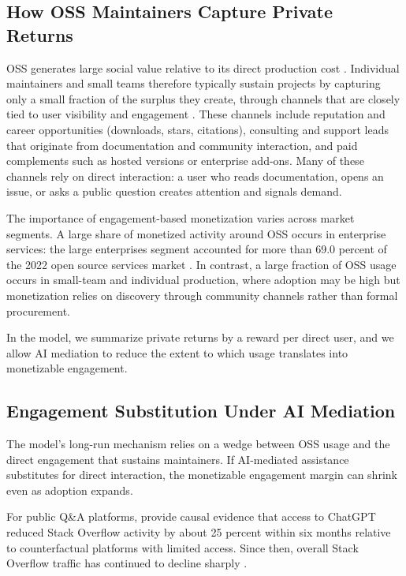 \documentclass[11pt,a4paper]{article}
\theoremstyle{definition}
\theoremstyle{remark}
\begin{document}
\subsection{How OSS Maintainers Capture Private Returns}

OSS generates large social value relative to its direct production cost \citep{hoffmann-nagle-zhou-2024}. Individual maintainers and small teams therefore typically sustain projects by capturing only a small fraction of the surplus they create, through channels that are closely tied to user visibility and engagement \citep{lerner-tirole-2002,jones-2020-eseur}. These channels include reputation and career opportunities (downloads, stars, citations), consulting and support leads that originate from documentation and community interaction, and paid complements such as hosted versions or enterprise add-ons. Many of these channels rely on direct interaction: a user who reads documentation, opens an issue, or asks a public question creates attention and signals demand.

The importance of engagement-based monetization varies across market segments. A large share of monetized activity around OSS occurs in enterprise services: the large enterprises segment accounted for more than 69.0 percent of the 2022 open source services market \citep{grand-view-research-2022-oss-services}. In contrast, a large fraction of OSS usage occurs in small-team and individual production, where adoption may be high but monetization relies on discovery through community channels rather than formal procurement.

In the model, we summarize private returns by a reward per direct user, and we allow AI mediation to reduce the extent to which usage translates into monetizable engagement.

\subsection{Engagement Substitution Under AI Mediation}

The model’s long-run mechanism relies on a wedge between OSS usage and the direct engagement that sustains maintainers. If AI-mediated assistance substitutes for direct interaction, the monetizable engagement margin can shrink even as adoption expands.

For public Q\&A platforms, \citet{del-rio-chanona-2024} provide causal evidence that access to ChatGPT reduced Stack Overflow activity by about 25 percent within six months relative to counterfactual platforms with limited access. Since then, overall Stack Overflow traffic has continued to decline sharply \citep{Orosz2025}.
\end{document}
